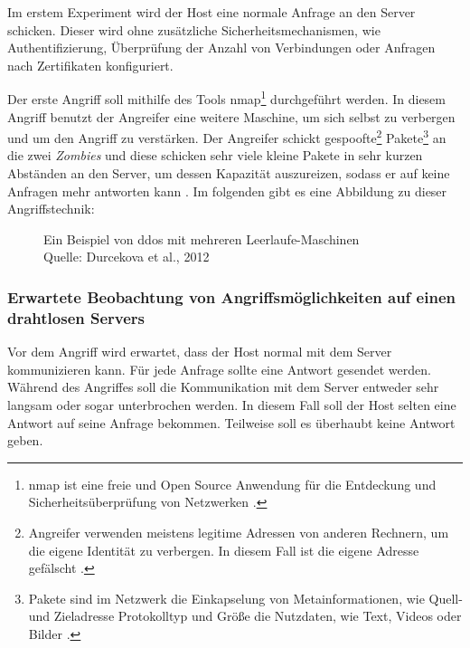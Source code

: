 Im erstem Experiment wird der Host eine normale Anfrage an den Server schicken. Dieser wird ohne zusätzliche 
Sicherheitsmechanismen, wie Authentifizierung, Überprüfung der Anzahl von Verbindungen oder Anfragen nach Zertifikaten 
konfiguriert.

Der erste Angriff soll mithilfe des Tools \acrfull{nmap}\footnote{\acrshort{nmap} ist eine freie und Open Source Anwendung
für die Entdeckung und Sicherheitsüberprüfung von Netzwerken \cite{refst:nmap}.} durchgeführt werden. In diesem Angriff 
benutzt der Angreifer eine weitere Maschine, um sich selbst zu verbergen und um den Angriff zu verstärken. Der Angreifer
schickt gespoofte\footnote{Angreifer verwenden meistens legitime Adressen von anderen Rechnern, um die eigene Identität
zu verbergen. In diesem Fall ist die eigene Adresse gefälscht \cite{refst:IPIO}.} Pakete\footnote{Pakete sind im Netzwerk
die Einkapselung von Metainformationen, wie Quell-und Zieladresse Protokolltyp und Größe die Nutzdaten, wie Text, 
Videos oder Bilder \cite{refbook:SWIS}.} an die zwei \textit{Zombies} und diese schicken sehr viele kleine Pakete in sehr
kurzen Abständen an den Server, um dessen Kapazität auszureizen, sodass er auf keine Anfragen mehr antworten kann 
\cite{refip:KSDD}. Im folgenden gibt es eine Abbildung zu dieser Angriffstechnik:

\begin{figure}[H]
  \caption{Ein Beispiel von \acrfull{ddos} mit mehreren Leerlaufe-Maschinen
  \\ Quelle: Durcekova et al., 2012}
  \label{fig:VDSD}
\end{figure}

\subsubsection{Erwartete Beobachtung von Angriffsmöglichkeiten auf einen drahtlosen Servers}
Vor dem Angriff wird erwartet, dass der Host normal mit dem Server kommunizieren kann. Für jede Anfrage sollte eine
Antwort gesendet werden. Während des Angriffes soll die Kommunikation mit dem Server entweder sehr langsam oder sogar unterbrochen 
werden. In diesem Fall soll der Host selten eine Antwort auf seine Anfrage bekommen. Teilweise soll es überhaubt 
keine Antwort geben. 

